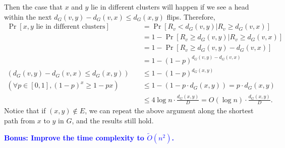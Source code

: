 \begin{answer}
\begin{enumerate}[label=\alph*).]
        Then the case that $x$ and $y$ lie in different clusters will happen if we see a head within the next $d_G(v,y) - d_G(v,x) \le d_G(x,y)$ flips. 
        Therefore, 
        \begin{align*}
            \Pr[x, y \text{ lie in different clusters}] &= \Pr[R_v < d_G(v,y) | R_v \ge d_G(v,x)] \\
            &= 1 - \Pr[R_v \ge d_G(v,y) | R_v \ge d_G(v,x)] \\
            &= 1 - \Pr[R_v \ge d_G(v,y)-d_G(v,x)] \\ 
            &= 1 - (1-p)^{d_G(v,y)-d_G(v,x)}  \\
            (d_G(v,y) - d_G(v,x) \le d_G(x,y))\quad&\le 1 - (1-p)^{d_G(x,y)} \\
            (\forall p \in [0,1],(1-p)^x \ge 1-px) \quad&\le 1 - ( 1 - p\cdot d_G(x,y)) = p\cdot d_G(x,y) \\
            &\le 4\log n \cdot \frac{d_G(x,y)}{D}  = O(\log n) \cdot \frac{d_G(x,y)}{D}.
        \end{align*}
        Notice that if $(x,y) \notin E$, we can repeat the above argument along the shortest path from $x$ to $y$ in $G$, and the results still hold.

        \textcolor{blue}{\textbf{Bonus: Improve the time complexity to $\tilde{O}(n^2)$.}}
        

\end{enumerate}
\end{answer}
